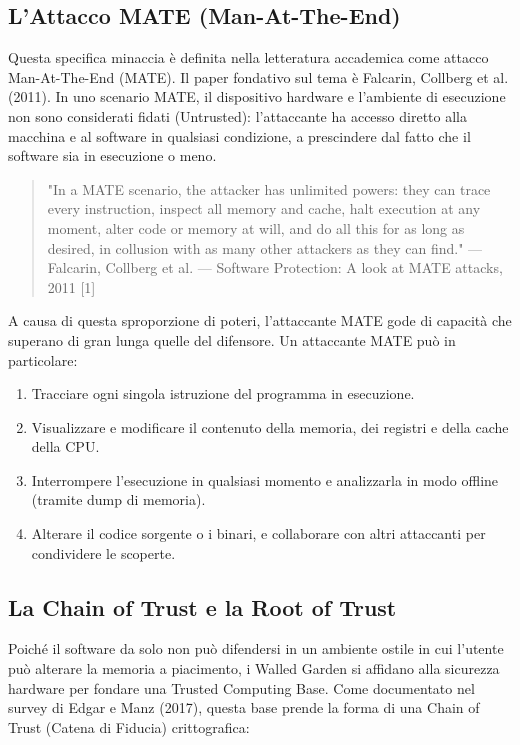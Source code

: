 \subsection{L'Attacco MATE (Man-At-The-End)}

Questa specifica minaccia è definita nella letteratura accademica come attacco Man-At-The-End (MATE). Il paper fondativo sul tema è Falcarin, Collberg et al. (2011). In uno scenario MATE, il dispositivo hardware e l'ambiente di esecuzione non sono considerati fidati (Untrusted): l'attaccante ha accesso diretto alla macchina e al software in qualsiasi condizione, a prescindere dal fatto che il software sia in esecuzione o meno.

\begin{quote}
\small "In a MATE scenario, the attacker has unlimited powers: they can trace every instruction, inspect all memory and cache, halt execution at any moment, alter code or memory at will, and do all this for as long as desired, in collusion with as many other attackers as they can find." --- Falcarin, Collberg et al. --- Software Protection: A look at MATE attacks, 2011 [1]
\end{quote}

A causa di questa sproporzione di poteri, l'attaccante MATE gode di capacità che superano di gran lunga quelle del difensore. Un attaccante MATE può in particolare:

\begin{enumerate}
\item Tracciare ogni singola istruzione del programma in esecuzione.
\item Visualizzare e modificare il contenuto della memoria, dei registri e della cache della CPU.
\item Interrompere l'esecuzione in qualsiasi momento e analizzarla in modo offline (tramite dump di memoria).
\item Alterare il codice sorgente o i binari, e collaborare con altri attaccanti per condividere le scoperte.
\end{enumerate}

\subsection{La Chain of Trust e la Root of Trust}

Poiché il software da solo non può difendersi in un ambiente ostile in cui l'utente può alterare la memoria a piacimento, i Walled Garden si affidano alla sicurezza hardware per fondare una Trusted Computing Base. Come documentato nel survey di Edgar e Manz (2017), questa base prende la forma di una Chain of Trust (Catena di Fiducia) crittografica:

